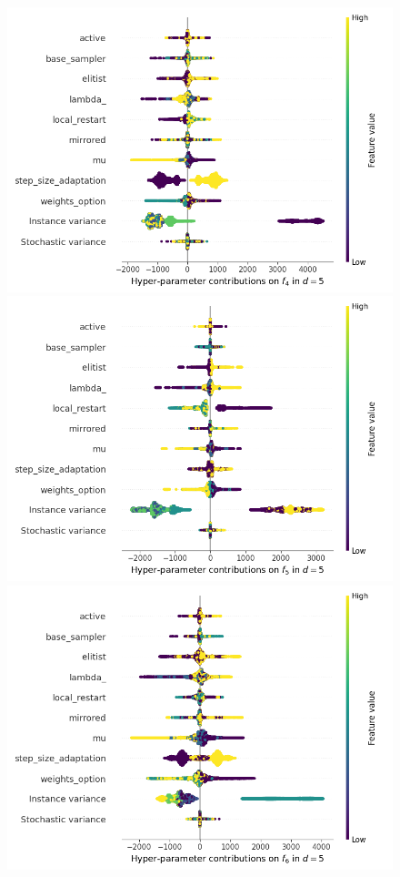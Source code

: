 \begin{figure}[t]
	\includegraphics[height=0.15\textheight,trim=60mm 0mm 0mm 0mm,clip]{cma_img_new/img_summary_f4_d5.png}
	\includegraphics[height=0.15\textheight,trim=0mm 0mm 30mm 0mm,clip]{cma_img_new/img_summary_f5_d5.png}
	\includegraphics[height=0.15\textheight,trim=60mm 0mm 30mm 0mm,clip]{cma_img_new/img_summary_f6_d5.png}

\end{figure}
